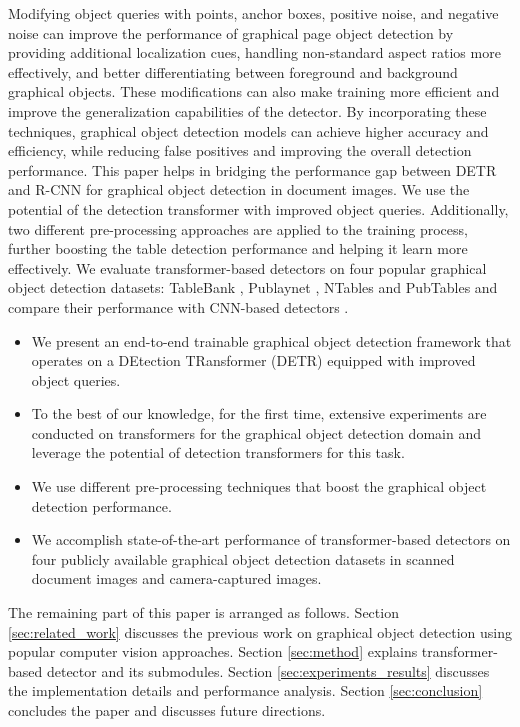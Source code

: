 \documentclass[sn-mathphys]{sn-jnl}\jyear{2021}\theoremstyle{thmstyleone}\newtheorem{theorem}{Theorem}\newtheorem{proposition}[theorem]{Proposition}\theoremstyle{thmstyletwo}\newtheorem{example}{Example}\newtheorem{remark}{Remark}\theoremstyle{thmstylethree}\newtheorem{definition}{Definition}\usepackage{amsmath}
\begin{document}
Modifying object queries with points, anchor boxes, positive noise, and negative noise can improve the performance of graphical page object detection by providing additional localization cues, handling non-standard aspect ratios more effectively, and better differentiating between foreground and background graphical objects. These modifications can also make training more efficient and improve the generalization capabilities of the detector. By incorporating these techniques, graphical object detection models can achieve higher accuracy and efficiency, while reducing false positives and improving the overall detection performance. This paper helps in bridging the performance gap between DETR and R-CNN for graphical object detection in document images. We use the potential of the detection transformer with improved object queries. Additionally, two different pre-processing approaches are applied to the training process, further boosting the table detection performance and helping it learn more effectively. We evaluate transformer-based detectors on four popular graphical object detection datasets: TableBank \cite{tablebank8}, Publaynet \cite{PubLayNet3}, NTables \cite{NTables} and PubTables \cite{pubtables5} and compare their performance with CNN-based detectors \cite{faster23, fast15, mask86, ssd23, retinaNet68, yolox34}. \par
\begin{itemize}
 \item We present an end-to-end trainable graphical object detection framework that operates on a DEtection TRansformer (DETR) equipped with improved object queries.
  \item To the best of our knowledge, for the first time, extensive experiments are conducted on transformers for the graphical object detection domain and leverage the potential of detection transformers for this task.
  \item  We use different pre-processing techniques that boost the graphical object detection performance.  
  \item We accomplish state-of-the-art performance of transformer-based detectors on four publicly available graphical object detection datasets in scanned document images and camera-captured images.
\end{itemize}
The remaining part of this paper is arranged as follows. Section \ref{sec:related_work} discusses the previous work on graphical object detection using popular computer vision approaches. Section \ref{sec:method} explains transformer-based detector and its submodules. Section \ref{sec:experiments_results} discusses the implementation details and performance analysis. Section \ref{sec:conclusion} concludes the paper and discusses future directions.
\end{document}
